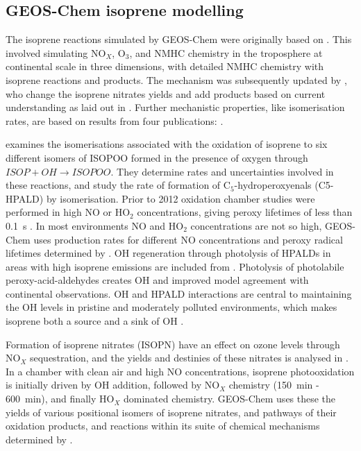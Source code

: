   \subsection{GEOS-Chem isoprene modelling}
    \label{Model:GC:Isop}
    
    The isoprene reactions simulated by GEOS-Chem were originally based on \textcite{Horowitz1998}.
    This involved simulating NO$_X$, O$_3$, and NMHC chemistry in the troposphere at continental scale in three dimensions, with detailed NMHC chemistry with isoprene reactions and products.
    The mechanism was subsequently updated by \textcite{Mao2013}, who change the isoprene nitrates yields and add products based on current understanding as laid out in \textcite{Paulot2009a, Paulot2009b}.
    Further mechanistic properties, like isomerisation rates, are based on results from four publications: \parencite{Peeters2009, Peeters2010, Crounse2011, Crounse2012}.
    
    \textcite{Crounse2011} examines the isomerisations associated with the oxidation of isoprene to six different isomers of ISOPOO formed in the presence of oxygen through $ISOP + OH \to ISOPOO$.
    They determine rates and uncertainties involved in these reactions, and study the rate of formation of C$_5$-hydroperoxyenals (C5-HPALD) by isomerisation.
    Prior to 2012 oxidation chamber studies were performed in high NO or HO$_2$ concentrations, giving peroxy lifetimes of less than 0.1~s \parencite{Crounse2012,Wolfe2012}.
    In most environments NO and HO$_2$ concentrations are not so high, GEOS-Chem uses production rates for different NO concentrations and peroxy radical lifetimes determined by \textcite{Crounse2012}.
    OH regeneration through photolysis of HPALDs in areas with high isoprene emissions are included from \textcite{Peeters2010}.
    Photolysis of photolabile peroxy-acid-aldehydes creates OH and improved model agreement with continental observations.
    OH and HPALD interactions are central to maintaining the OH levels in pristine and moderately polluted environments, which makes isoprene both a source and a sink of OH \parencite{Peeters2010,Taraborrelli2012}.
    
    Formation of isoprene nitrates (ISOPN) have an effect on ozone levels through NO$_X$ sequestration, and the yields and destinies of these nitrates is analysed in \textcite{Paulot2009a}.
    In a chamber with clean air and high NO concentrations, isoprene photooxidation is initially driven by OH addition, followed by NO$_X$ chemistry (150~min - 600~min), and finally HO$_X$ dominated chemistry.
    GEOS-Chem uses these the yields of various positional isomers of isoprene nitrates, and pathways of their oxidation products, and reactions within its suite of chemical mechanisms determined by \textcite{Paulot2009a,Mao2013}.
    
